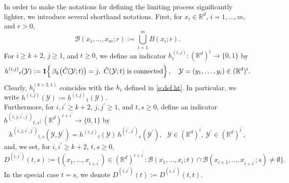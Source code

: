 \documentclass[11pt]{amsart}
\numberwithin{equation}{section}
\theoremstyle{plain}
\theoremstyle{definition}
\begin{document}
In order to make the notations for defining the limiting process significantly lighter, we introduce several shorthand notations.
First, for $x_i \in {{\mathbb R}}^d$, $i=1,\dots,m$, and $r>0$,
$$
{\mathcal B} (x_1,\dots,x_m; r) := \bigcup_{i=1}^m B(x_i; r).
$$
For $i \geq k+2$, $j\geq1$, and $t\geq0$, we define an indicator $h_t^{(i,j)}: ({{\mathbb R}}^d)^i \to \{ 0,1 \}$ by
\begin{equation}  \label{e:def.hijt}
{h^{(i,j)}}_t({{\mathcal{Y}}}) := {{\bf 1}} \Bigl\{\, \beta_k \bigl( \check{C}({{\mathcal{Y}}}; t) \bigr) = j, \ \check{C}({{\mathcal{Y}}}; t) \text{ is connected} \Bigr\}\,, \ \ \ {{\mathcal{Y}}} = (y_1,\dots,y_i) \in ({{\mathbb R}}^d)^i.
\end{equation}
Clearly, $h_t^{(k+2,1)}$ coincides with the $h_t$ defined in \eqref{e:def.ht}. In particular, we write ${h^{(i,j)}}({{\mathcal{Y}}}) := {h^{(i,j)}}_1({{\mathcal{Y}}})$. \\
Furthermore, for $i, {i^{\prime}} \geq k+2$, $j, {j^{\prime}} \geq 1$, and $t,s \geq0$, define an indicator ${h^{(i, j, i^{\prime}, j^{\prime})}}_{t,s}: ({{\mathbb R}}^d)^{i + {i^{\prime}}} \to \{ 0,1 \}$ by
$$
{h^{(i, j, i^{\prime}, j^{\prime})}}_{t,s} ({{\mathcal{Y}}}, {{\mathcal{Y}^{\prime}}}) = {h^{(i,j)}}_t({{\mathcal{Y}}})\, {h^{({i^{\prime}},{j^{\prime}})}}_s({{\mathcal{Y}^{\prime}}}), \ \ \ {{\mathcal{Y}}} \in ({{\mathbb R}}^d)^i, \ {{\mathcal{Y}^{\prime}}} \in ({{\mathbb R}}^d)^{i^{\prime}},
$$
and, we set, for $i, {i^{\prime}} \geq k+2$, $t,s\geq0$,
$$
{D^{(i,{i^{\prime}})}} (t,s) := \bigl\{ (x_1,\dots,x_{i+{i^{\prime}}}) \in ({{\mathbb R}}^d)^{i+{i^{\prime}}}: {\mathcal B}(x_1,\dots,x_i; t) \cap {\mathcal B} (x_{i+1},\dots, x_{i+{i^{\prime}}}; s) \neq \emptyset \bigr\}.
$$
In the special case $t=s$, we denote ${D^{(i,{i^{\prime}})}} (t) := {D^{(i,{i^{\prime}})}} (t,t)$.
\end{document}
